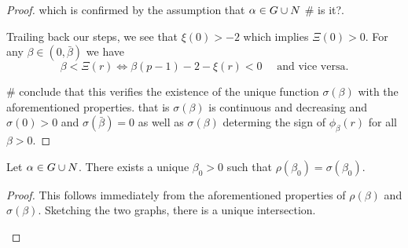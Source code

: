 \begin{proof}
which is confirmed by the assumption that $\alpha\in G\cup N$ \# is it?.

Trailing back our steps, we see that $\xi(0)>-2$ which implies $\Xi(0)>0$. For
any $\beta\in(0,\bar{\beta})$ we have
$$\beta<\Xi(r)\iff\beta(p-1)-2-\xi(r)<0\quad\text{ and vice versa.}$$ 

\# conclude that this verifies the existence of the unique function
$\sigma(\beta)$ with the aforementioned properties. that is $\sigma(\beta)$ is
continuous and decreasing and $\sigma(0)>0$ and $\sigma(\bar{\beta})=0$ as well
as $\sigma(\beta)$ determing the sign of $\phi_\beta(r)$ for all $\beta>0$.
\end{proof}
\endgroup

\begin{lemma}\label{genlem5}
Let $\alpha\in G\cup N$. There exists a unique $\beta_0 > 0$ such that $\rho \left(
\beta_0 \right) = \sigma \left( \beta_0 \right)$.
\end{lemma}
\begin{proof}
This follows immediately from the {\red aforementioned} properties of $\rho(\beta)$ and
$\sigma(\beta)$. Sketching the two graphs, there is a unique
intersection.\hfill\\

\begin{centering}
\end{centering} 
\end{proof}

